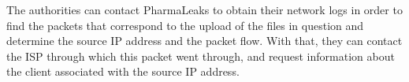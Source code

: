 The authorities can contact PharmaLeaks to obtain their network logs in order to find the packets that correspond to the upload of the files in question and determine the source IP address and the packet flow. With that, they can contact the ISP through which this packet went through, and request information about the client associated with the source IP address. 